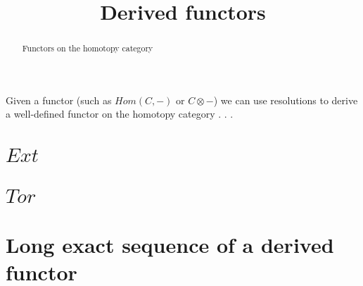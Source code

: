 \documentclass{ximera}
\title{Derived functors}
\begin{document}
\begin{abstract}
  Functors on the homotopy category
\end{abstract}
\maketitle

Given a functor (such as $Hom(C,-)$ or $C \otimes -$) we can use
resolutions to derive a well-defined functor on the homotopy
category . . .

\section{$Ext$}

\section{$Tor$}

\section{Long exact sequence of a derived functor}
\end{document}
